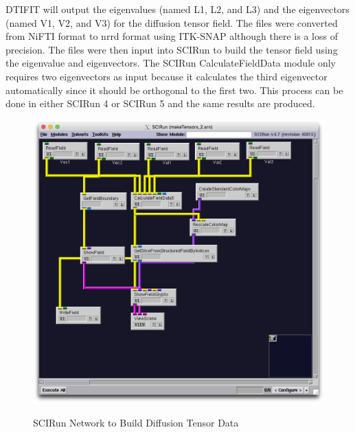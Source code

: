 DTIFIT will output the eigenvalues (named L1, L2, and L3) and the eigenvectors (named V1, V2, and V3) for the diffusion tensor field. The files were converted from NiFTI format to nrrd format using ITK-SNAP \cite{ref:itksnap} although there is a loss of precision. The files were then input into SCIRun to build the tensor field using the eigenvalue and eigenvectors. The SCIRun CalculateFieldData module only requires two eigenvectors as input because it calculates the third eigenvector automatically since it should be orthogonal to the first two. This process can be done in either SCIRun 4 or SCIRun 5 and the same results are produced. 

\begin{figure}[p]
\begin{center}
\includegraphics[width=\textwidth]{Figures/make_DTI.png}\\
\caption{SCIRun Network to Build Diffusion Tensor Data}
\label{fig:maketensornet}
\end{center}
\end{figure}

